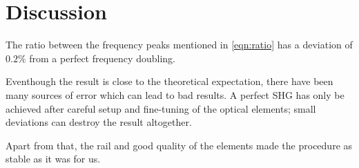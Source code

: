 \section{Discussion}
\label{sec:discussion}
The ratio between the frequency peaks mentioned in \autoref{eqn:ratio} has a deviation of $0.2\%$
from a perfect frequency doubling.

Eventhough the result is close to the theoretical expectation, there have been many sources of
error which can lead to bad results. A perfect SHG has only be achieved after careful setup and
fine-tuning of the optical elements; small deviations can destroy the result altogether.

Apart from that, the rail and good quality of the elements made the procedure as stable as it was
for us.

